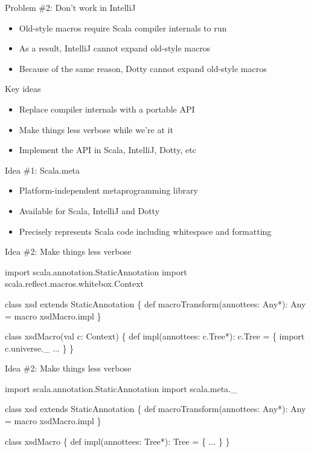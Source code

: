 \documentclass[svgnames,dvipsnames,hyperref={bookmarks=false},usepdftitle=false]{beamer}
\begin{document}
\begin{frame}{Problem \#2: Don't work in IntelliJ}
\begin{itemize}
\item Old-style macros require Scala compiler internals to run
\item As a result, IntelliJ cannot expand old-style macros
\item Because of the same reason, Dotty cannot expand old-style macros
\end{itemize}
\end{frame}


\begin{frame}{Key ideas}
\begin{itemize}
\item Replace compiler internals with a portable API
\item Make things less verbose while we're at it
\item Implement the API in Scala, IntelliJ, Dotty, etc
\end{itemize}
\end{frame}

\begin{frame}[fragile]{Idea \#1: Scala.meta}
\begin{itemize}
\item Platform-independent metaprogramming library
\item Available for Scala, IntelliJ and Dotty
\item Precisely represents Scala code including whitespace and formatting
\end{itemize}
\end{frame}

\begin{frame}[fragile]{Idea \#2: Make things less verbose}
\begin{semiverbatim}
import scala.annotation.StaticAnnotation
import scala.reflect.macros.whitebox.Context

class xsd extends StaticAnnotation \{
  def macroTransform(annottees: Any*): Any =
    macro xsdMacro.impl
\}

class xsdMacro(val c: Context) \{
  def impl(annottees: c.Tree*): c.Tree = \{
    import c.universe._
    ...
  \}
\}
\end{semiverbatim}
\end{frame}

\begin{frame}[fragile]{Idea \#2: Make things less verbose}
\begin{semiverbatim}
import scala.annotation.StaticAnnotation
\alert{import scala.meta._}

class xsd extends StaticAnnotation \{
  def macroTransform(annottees: Any*): Any =
    macro xsdMacro.impl
\}

\alert{class xsdMacro \{}
\alert{  def impl(annottees: Tree*): Tree = \{}
    ...
  \}
\}
\end{semiverbatim}
\end{frame}
\end{document}
